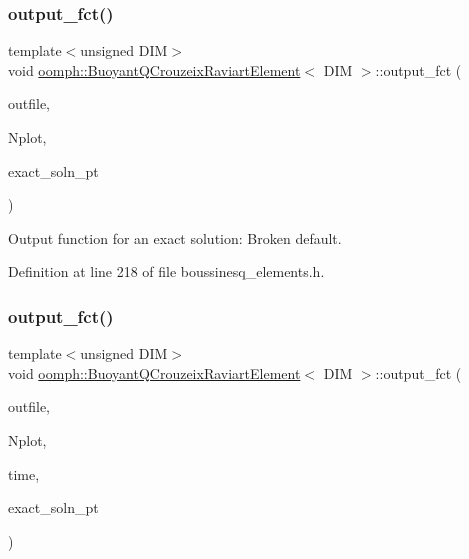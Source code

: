\subsubsection{\texorpdfstring{output\+\_\+fct()}{output\_fct()}\hspace{0.1cm}{\footnotesize\ttfamily [1/2]}}
{\footnotesize\ttfamily template$<$unsigned D\+IM$>$ \\
void \hyperlink{classoomph_1_1BuoyantQCrouzeixRaviartElement}{oomph\+::\+Buoyant\+Q\+Crouzeix\+Raviart\+Element}$<$ D\+IM $>$\+::output\+\_\+fct (\begin{DoxyParamCaption}\item[{std\+::ostream \&}]{outfile,  }\item[{const unsigned \&}]{Nplot,  }\item[{Finite\+Element\+::\+Steady\+Exact\+Solution\+Fct\+Pt}]{exact\+\_\+soln\+\_\+pt }\end{DoxyParamCaption})\hspace{0.3cm}{\ttfamily [inline]}}



Output function for an exact solution\+: Broken default. 



Definition at line 218 of file boussinesq\+\_\+elements.\+h.

\mbox{\label{classoomph_1_1BuoyantQCrouzeixRaviartElement_ae1c6dc6850532af9ec618415ba31e053}} 
\subsubsection{\texorpdfstring{output\+\_\+fct()}{output\_fct()}\hspace{0.1cm}{\footnotesize\ttfamily [2/2]}}
{\footnotesize\ttfamily template$<$unsigned D\+IM$>$ \\
void \hyperlink{classoomph_1_1BuoyantQCrouzeixRaviartElement}{oomph\+::\+Buoyant\+Q\+Crouzeix\+Raviart\+Element}$<$ D\+IM $>$\+::output\+\_\+fct (\begin{DoxyParamCaption}\item[{std\+::ostream \&}]{outfile,  }\item[{const unsigned \&}]{Nplot,  }\item[{const double \&}]{time,  }\item[{Finite\+Element\+::\+Unsteady\+Exact\+Solution\+Fct\+Pt}]{exact\+\_\+soln\+\_\+pt }\end{DoxyParamCaption})\hspace{0.3cm}{\ttfamily [inline]}}



